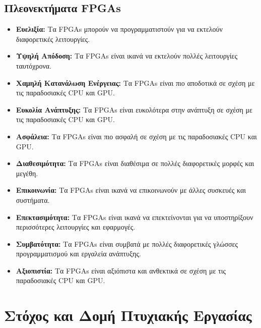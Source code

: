 \subsection{Πλεονεκτήματα FPGAs}

\begin{itemize}
    \item \textbf{Ευελιξία:} Τα FPGAs μπορούν να προγραμματιστούν για να εκτελούν διαφορετικές λειτουργίες.
    \item \textbf{Υψηλή Απόδοση:} Τα FPGAs είναι ικανά να εκτελούν πολλές λειτουργίες ταυτόχρονα.
    \item \textbf{Χαμηλή Κατανάλωση Ενέργειας:} Τα FPGAs είναι πιο αποδοτικά σε σχέση με τις παραδοσιακές CPU και GPU.
    \item \textbf{Ευκολία Ανάπτυξης:} Τα FPGAs είναι ευκολότερα στην ανάπτυξη σε σχέση με τις παραδοσιακές CPU και GPU.
    \item \textbf{Ασφάλεια:} Τα FPGAs είναι πιο ασφαλή σε σχέση με τις παραδοσιακές CPU και GPU.
    \item \textbf{Διαθεσιμότητα:} Τα FPGAs είναι διαθέσιμα σε πολλές διαφορετικές μορφές και μεγέθη.
    \item \textbf{Επικοινωνία:} Τα FPGAs είναι ικανά να επικοινωνούν με άλλες συσκευές και συστήματα.
    \item \textbf{Επεκτασιμότητα:} Τα FPGAs είναι ικανά να επεκτείνονται για να υποστηρίξουν περισσότερες λειτουργίες και εφαρμογές.
    \item \textbf{Συμβατότητα:} Τα FPGAs είναι συμβατά με πολλές διαφορετικές γλώσσες προγραμματισμού και εργαλεία ανάπτυξης.
    \item \textbf{Αξιοπιστία:} Τα FPGAs είναι αξιόπιστα και ανθεκτικά σε σχέση με τις παραδοσιακές CPU και GPU.
\end{itemize}

\section{Στόχος και Δομή Πτυχιακής Εργασίας}